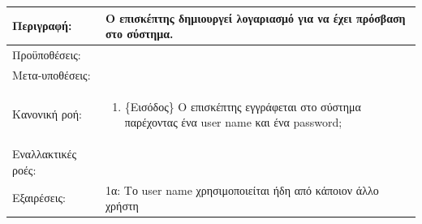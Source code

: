 \documentclass{assignment}
\begin{document}
\begin{longtable}{| p{3.5cm} | p{9cm} |}
\hline
Περιγραφή: &
Ο επισκέπτης δημιουργεί λογαριασμό για να έχει πρόσβαση στο σύστημα.\\
\hline
Προϋποθέσεις: &\mbox{}\par\vspace{-\baselineskip}
\\
\hline
Μετα-υποθέσεις: & \\
\hline
Κανονική ροή: &\mbox{}\par\vspace{-\baselineskip}
\begin{enumerate}
\item \{Εισόδος\} Ο επισκέπτης εγγράφεται στο σύστημα παρέχοντας ένα user name και ένα password;
\end{enumerate}\\
\hline
Εναλλακτικές ροές: & \\
\hline
Εξαιρέσεις: &\mbox{}\par\vspace{-\baselineskip} 
1α: Το user name χρησιμοποιείται ήδη από κάποιον άλλο χρήστη

\end{longtable}
\end{document}
